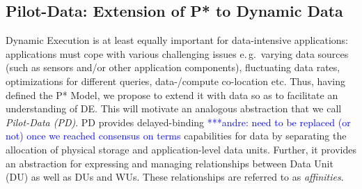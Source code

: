\documentclass[conference,final]{IEEEtran}
\newcommand{\jhanote}[1]{ {\textcolor{red} { ***shantenu: #1 }}}
\newcommand{\alnote}[1]{ {\textcolor{blue} { ***andre: #1 }}}
\newcommand{\alnote}[1]{}
\newcommand{\jhanote}[1]{}
\newcommand{\upp}{\vspace*{-0.5em}}
\begin{document}
\subsection{Pilot-Data: Extension of P* to Dynamic Data\upp\upp}
\label{sec:pilot-data}








Dynamic Execution is at least equally important for data-intensive
applications: applications must cope with various challenging issues
e.\,g.\ varying data sources (such as sensors and/or other application
components), fluctuating data rates, optimizations for different
queries, data-/compute co-location etc. Thus, having defined the P*
Model, we propose to extend it with data so as to facilitate an
understanding of DE. This will motivate an analogous abstraction that
we call \emph{Pilot-Data (PD)}. PD provides delayed-binding
\alnote{need to be replaced (or not) once we reached consensus on
  terms} capabilities for data by separating the allocation of
physical storage and application-level data units. Further, it
provides an abstraction for expressing and managing relationships
between Data Unit (DU) as well as DUs and WUs. These relationships are
referred to as \emph{affinities}.  %
\end{document}
